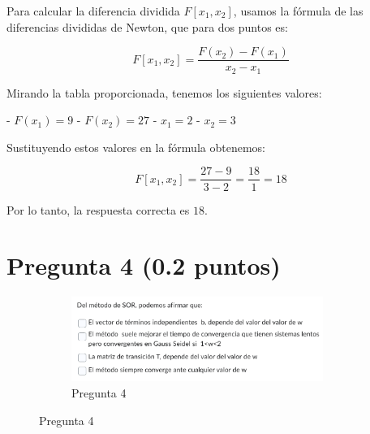 Para calcular la diferencia dividida \( F[x_1, x_2] \), usamos la fórmula de las diferencias divididas de Newton, que para dos puntos es:

\[ F[x_1, x_2] = \frac{F(x_2) - F(x_1)}{x_2 - x_1} \]

Mirando la tabla proporcionada, tenemos los siguientes valores:

- \( F(x_1) = 9 \)
- \( F(x_2) = 27 \)
- \( x_1 = 2 \)
- \( x_2 = 3 \)

Sustituyendo estos valores en la fórmula obtenemos:

\[ F[x_1, x_2] = \frac{27 - 9}{3 - 2} = \frac{18}{1} = 18 \]

Por lo tanto, la respuesta correcta es \( 18 \).


\section{Pregunta 4 (0.2 puntos)}

\begin{figure}[H]
    \centering
    \begin{subfigure}[b]{0.9\textwidth}
        \centering
        \includegraphics[width=0.9\textwidth]{Figures/0. General/4.png}
        \caption{Pregunta 4}
        \label{fig: pregunta 4}
    \end{subfigure}
\end{figure}


